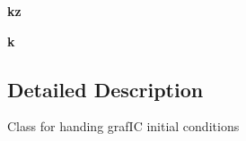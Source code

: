 \begin{DoxyCompactItemize}
\item 
\hypertarget{classseren3_1_1core_1_1grafic__snapshot_1_1GrafICSnapshot_a95da1da6e2528f86d309deffe383075f}{
{\bfseries kz}}
\label{classseren3_1_1core_1_1grafic__snapshot_1_1GrafICSnapshot_a95da1da6e2528f86d309deffe383075f}

\item 
\hypertarget{classseren3_1_1core_1_1grafic__snapshot_1_1GrafICSnapshot_a00e0d9c1390a04cc63be64e31ddfde88}{
{\bfseries k}}
\label{classseren3_1_1core_1_1grafic__snapshot_1_1GrafICSnapshot_a00e0d9c1390a04cc63be64e31ddfde88}

\end{DoxyCompactItemize}


\subsection{Detailed Description}
\begin{DoxyVerb}
Class for handing grafIC initial conditions
\end{DoxyVerb}
 

